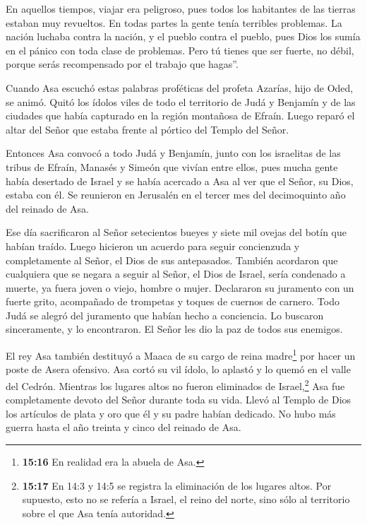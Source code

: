  En aquellos tiempos, viajar era peligroso, pues todos los
habitantes de las tierras estaban muy revueltos. En todas partes la
gente tenía terribles problemas.  La nación luchaba contra
la nación, y el pueblo contra el pueblo, pues Dios los sumía en el
pánico con toda clase de problemas.  Pero tú tienes que ser
fuerte, no débil, porque serás recompensado por el trabajo que hagas''.

 Cuando Asa escuchó estas palabras proféticas del profeta
Azarías, hijo de Oded, se animó. Quitó los ídolos viles de todo el
territorio de Judá y Benjamín y de las ciudades que había capturado en
la región montañosa de Efraín. Luego reparó el altar del Señor que
estaba frente al pórtico del Templo del Señor.

 Entonces Asa convocó a todo Judá y Benjamín, junto con los
israelitas de las tribus de Efraín, Manasés y Simeón que vivían entre
ellos, pues mucha gente había desertado de Israel y se había acercado a
Asa al ver que el Señor, su Dios, estaba con él.  Se
reunieron en Jerusalén en el tercer mes del decimoquinto año del reinado
de Asa.

 Ese día sacrificaron al Señor setecientos bueyes y siete
mil ovejas del botín que habían traído.  Luego hicieron un
acuerdo para seguir concienzuda y completamente al Señor, el Dios de sus
antepasados.  También acordaron que cualquiera que se
negara a seguir al Señor, el Dios de Israel, sería condenado a muerte,
ya fuera joven o viejo, hombre o mujer.  Declararon su
juramento con un fuerte grito, acompañado de trompetas y toques de
cuernos de carnero.  Todo Judá se alegró del juramento que
habían hecho a conciencia. Lo buscaron sinceramente, y lo encontraron.
El Señor les dio la paz de todos sus enemigos.

 El rey Asa también destituyó a Maaca de su cargo de reina
madre\footnote{\textbf{15:16} En realidad era la abuela de Asa.} por
hacer un poste de Asera ofensivo. Asa cortó su vil ídolo, lo aplastó y
lo quemó en el valle del Cedrón.  Mientras los lugares
altos no fueron eliminados de Israel,\footnote{\textbf{15:17} En 14:3 y
  14:5 se registra la eliminación de los lugares altos. Por supuesto,
  esto no se refería a Israel, el reino del norte, sino sólo al
  territorio sobre el que Asa tenía autoridad.} Asa fue completamente
devoto del Señor durante toda su vida.  Llevó al Templo de
Dios los artículos de plata y oro que él y su padre habían dedicado.
 No hubo más guerra hasta el año treinta y cinco del
reinado de Asa.

